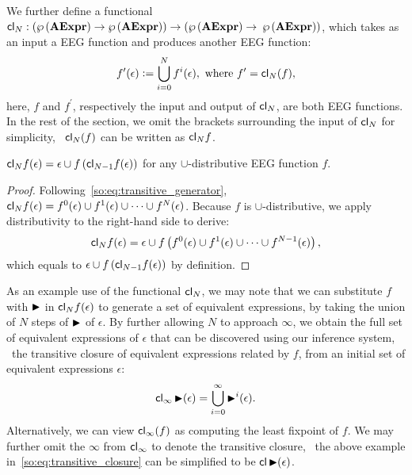 \renewcommand{\closure}{\ensuremath\mathsf{cl}}

We further define a functional $\closure_N: ( \powersetof\aexprset \to
\powersetof\aexprset ) \to ( \powersetof\aexprset \to$ $\wp\left({\mathbf{AExpr}}\right)
)$, which takes as an input a EEG function and produces another EEG function:
\begin{equation}
    f^\prime (\epsilon) \defeq
        \bigcup_{i = 0}^N f^i(\epsilon),
    \text{~where~} f^\prime = \closure_N (f),
    \label{so:eq:transitive_generator}
\end{equation}
here, $f$ and $f^\prime$, respectively the input and output of $\closure_N$,
are both EEG functions.  In the rest of the section, we omit the brackets
surrounding the input of $\closure_N$ for simplicity, \eg~$\closure_N
(f)$ can be written as $\closure_N f$.

\begin{lemma}
    $\closure_N f(\epsilon) = \epsilon \cup f \left( \closure_{N-1} f(\epsilon)
    \right)$ for any $\cup$-distributive EEG function $f$.
    {}\label{so:lem:transitive}
\end{lemma}
\begin{proof}
    Following~\eqref{so:eq:transitive_generator}, $\closure_N f(\epsilon) =
    f^0(\epsilon) \cup f^1(\epsilon) \cup \cdots \cup f^N(\epsilon)$.  Because
    $f$ is $\cup$-distributive, we apply distributivity to the right-hand side
    to derive:
    \begin{equation}
        \closure_N f(\epsilon) = \epsilon \cup f\left(
            f^0(\epsilon) \cup f^1(\epsilon) \cup \cdots \cup f^{N-1}(\epsilon)
        \right),
    \end{equation}
    which equals to $\epsilon \cup f\left( \closure_{N-1} f(\epsilon) \right)$
    by definition.
\end{proof}

As an example use of the functional $\closure_N$, we may note that we can
substitute $f$ with $\operatorname{\blacktriangleright}$ in $\closure_N f (\epsilon)$ to generate a set
of equivalent expressions, by taking the union of $N$ steps of $\operatorname{\blacktriangleright}$ of
$\epsilon$.  By further allowing $N$ to approach $\infty$, we obtain the full
set of equivalent expressions of $\epsilon$ that can be discovered using our
inference system, \ie~the transitive closure of equivalent expressions related
by $f$, from an initial set of equivalent expressions $\epsilon$:
\begin{equation}
    \closure_\infty \eqstep (\epsilon) =
        \bigcup_{i = 0}^\infty \eqstep^i(\epsilon).
    \label{so:eq:transitive_closure}
\end{equation}
Alternatively, we can view $\closure_\infty (f)$ as computing the
least fixpoint of $f$.  We may further omit the $\infty$ from
$\closure_\infty$ to denote the transitive closure, \eg~the above example
in~\ref{so:eq:transitive_closure} can be simplified to be $\closure \eqstep
(\epsilon)$.

